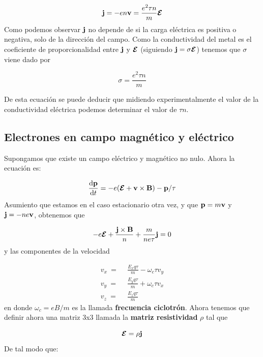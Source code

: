 \begin{equation}
	\mathbf{j} = - e n \mathbf{v}  = \frac{e^2 \tau n}{m} \boldsymbol{\mathcal{E}}
\end{equation}
Como podemos observar $\mathbf{j}$ no depende de si la carga eléctrica es positiva o negativa, solo de la dirección del campo. Como la conductividad del metal es el coeficiente de proporcionalidad entre $\mathbf{j}$ y $\boldsymbol{\mathcal{E}}$ (siguiendo $\mathbf{j} = \sigma \boldsymbol{\mathcal{E}}$) tenemos que $\sigma$ viene dado por
\begin{mybox}
\begin{equation}
	\sigma = \frac{e^2 \tau n}{m}
\end{equation}
\end{mybox}
De esta ecuación se puede deducir que midiendo experimentalmente el valor de la conductividad eléctrica podemos determinar el valor de $\tau n$.

\subsection{Electrones en campo magnético y eléctrico}

Supongamos que existe un campo eléctrico y magnético no nulo. Ahora la ecuación es:

\begin{equation}
	\frac{\mathrm{d} \mathbf{p}}{\mathrm{d} t} = - e (\boldsymbol{\mathcal{E}} + \mathbf{v} \times \mathbf{B})  - \mathbf{p}  / \tau
\end{equation}
Asumiento que estamos en el caso estacionario otra vez, y que $\mathbf{p}=m\mathbf{v}$ y $\mathbf{j}=-ne\mathbf{v}$, obtenemos que

\begin{equation}
	-e \boldsymbol{\mathcal{E}} + \frac{\mathbf{j} \times \mathbf{B}}{n} + \frac{m}{ne\tau} \mathbf{j} = 0
\end{equation}
y las componentes de la velocidad

\begin{equation}
	\begin{split}
		v_x \  = \  & \ \frac{E_x q\tau}{m} - \omega_c \tau v_y \\
		v_y \  = \  & \ \frac{E_y q\tau}{m} + \omega_c \tau v_x \\
		v_z \  = \  & \ \frac{E_z q\tau}{m}  \label{Ec:06-06-04}
	\end{split}
\end{equation}
en donde $\omega_c = eB/m$ es la llamada \textbf{frecuencia ciclotrón}. Ahora tenemos que definir ahora una matriz 3x3 llamada la \textbf{matriz resistividad} $\rho$ tal que 

\begin{equation}
	\boldsymbol{\mathcal{E}} = \rho \mathbf{j}
\end{equation}
De tal modo que:

